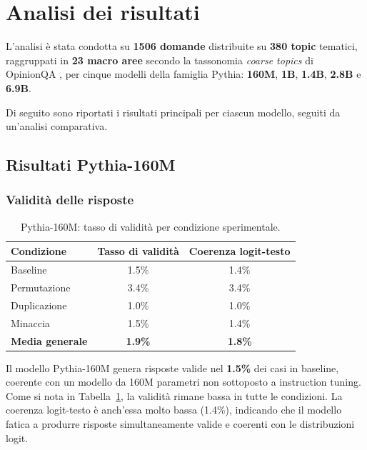 \documentclass[../relazione.tex]{subfiles}
\begin{document}
\section{Analisi dei risultati}
\label{sec:risultati}
L'analisi è stata condotta su \textbf{1506 domande} distribuite su \textbf{380 topic} tematici, raggruppati in \textbf{23 macro aree} secondo la tassonomia \emph{coarse topics} di OpinionQA \cite{santurkar2023whose}, per cinque modelli della famiglia Pythia: \textbf{160M}, \textbf{1B}, \textbf{1.4B}, \textbf{2.8B} e \textbf{6.9B}. 

Di seguito sono riportati i risultati principali per ciascun modello, seguiti da un'analisi comparativa.

\subsection{Risultati Pythia-160M}
\subsubsection{Validità delle risposte}

\begin{table}[H]
\centering
\begin{tabular}{lcc}
\toprule
\textbf{Condizione} & \textbf{Tasso di validità} & \textbf{Coerenza logit-testo}\\
\midrule
Baseline      & 1.5\% & 1.4\% \\
Permutazione  & 3.4\% & 3.4\% \\
Duplicazione  & 1.0\% & 1.0\% \\
Minaccia      & 1.5\% & 1.4\% \\
\midrule
\textbf{Media generale} & \textbf{1.9\%} & \textbf{1.8\%}\\
\bottomrule
\end{tabular}
\caption{Pythia-160M: tasso di validità per condizione sperimentale.}
\label{tab:160m_validity}
\end{table}

Il modello Pythia-160M genera risposte valide nel \textbf{1.5\%} dei casi in baseline, coerente con un modello da 160M parametri non sottoposto a instruction tuning. Come si nota in Tabella~\ref{tab:160m_validity}, la validità rimane bassa in tutte le condizioni. La coerenza logit-testo è anch'essa molto bassa (1.4\%), indicando che il modello fatica a produrre risposte simultaneamente valide e coerenti con le distribuzioni logit.
\end{document}
